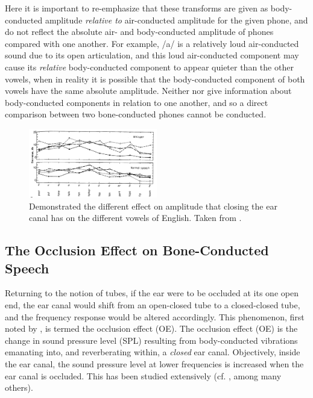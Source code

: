 Here it is important to re-emphasize that these transforms are given as body-conducted amplitude \textit{relative to} air-conducted amplitude for the given phone, and do not reflect the absolute air- and body-conducted amplitude of phones compared with one another.  For example, /a/ is a relatively loud air-conducted sound due to its open articulation, and this loud air-conducted component may cause its \textit{relative} body-conducted component to appear quieter than the other vowels, when in reality it is possible that the body-conducted component of both vowels have the same absolute amplitude.  Neither \cite{bekesy:60} nor \cite{reinfeldt:10} give information about body-conducted components in relation to one another, and so a direct comparison between two bone-conducted phones cannot be conducted.


\begin{figure}
\includegraphics[width=0.5\textwidth]{figure/bekesy60-3.png}
\caption{Demonstrated the different effect on amplitude that closing the ear canal has on the different vowels of English.  Taken from \cite{bekesy:60}.}
\label{bekesyPhoneDiff}
\end{figure}

\subsection{The Occlusion Effect on Bone-Conducted Speech}\label{sec:OEBCspeech}

Returning to the notion of tubes, if the ear were to be occluded at its one open end, the ear canal would shift from an open-closed tube to a closed-closed tube, and the frequency response would be altered accordingly.  This phenomenon, first noted by \cite{wheatstone:79}, is termed the occlusion effect (OE).  The occlusion effect (OE) is the change in sound pressure level (SPL) resulting from body-conducted vibrations emanating into, and reverberating within, a \textit{closed} ear canal.  Objectively, inside the ear canal, the sound pressure level at lower frequencies is increased when the ear canal is occluded.  This has been studied extensively (cf. \cite{wheatstone:79,kelly:37,littler:52,tonndorf:66}, among many others).  %

